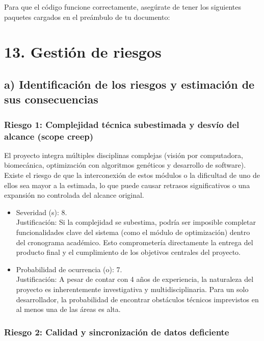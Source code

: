 \documentclass[
11pt, %
]{charter}
\begin{document}
Para que el código funcione correctamente, asegúrate de tener los siguientes paquetes cargados en el preámbulo de tu documento:


\section{13. Gestión de riesgos}
\label{sec:riesgos}

\subsection*{a) Identificación de los riesgos y estimación de sus consecuencias}

\subsubsection*{Riesgo 1: Complejidad técnica subestimada y desvío del alcance (scope creep)}

El proyecto integra múltiples disciplinas complejas (visión por computadora, biomecánica, optimización con algoritmos genéticos y desarrollo de software). Existe el riesgo de que la interconexión de estos módulos o la dificultad de uno de ellos sea mayor a la estimada, lo que puede causar retrasos significativos o una expansión no controlada del alcance original.
\begin{itemize}
  \item Severidad (s): 8.\\
  Justificación: Si la complejidad se subestima, podría ser imposible completar funcionalidades clave del sistema (como el módulo de optimización) dentro del cronograma académico. Esto comprometería directamente la entrega del producto final y el cumplimiento de los objetivos centrales del proyecto.
  \item Probabilidad de ocurrencia (o): 7.\\
  Justificación: A pesar de contar con 4 años de experiencia, la naturaleza del proyecto es inherentemente investigativa y multidisciplinaria. Para un solo desarrollador, la probabilidad de encontrar obstáculos técnicos imprevistos en al menos una de las áreas es alta.
\end{itemize}   

\subsubsection*{Riesgo 2: Calidad y sincronización de datos deficiente}
\end{document}

